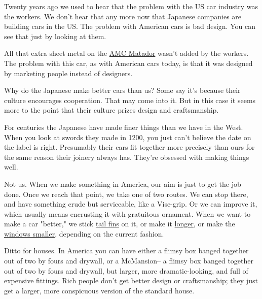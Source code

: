 Twenty years
                  ago we used to hear that the problem with the US car industry
                  was the workers. We don't hear that any more now that Japanese
                  companies are building cars in the US. The problem with
                  American cars is bad design. You can see that just by looking
                  at them.

All that extra sheet metal on the
                  \href{http://www.paulgraham.com/matador.html}{AMC Matador} wasn't added by the
                  workers. The problem with this car, as with American cars
                  today, is that it was designed by marketing people instead of
                  designers.

Why do the Japanese make better cars
                  than us? Some say it's because their culture encourages
                  cooperation. That may come into it. But in this case it seems
                  more to the point that their culture prizes design and
                  craftsmanship.

For centuries the Japanese have made
                  finer things than we have in the West. When you look at swords
                  they made in 1200, you just can't believe the date on the
                  label is right. Presumably their cars fit together more
                  precisely than ours for the same reason their joinery always
                  has. They're obsessed with making things well.

Not
                  us. When we make something in America, our aim is just to get
                  the job done. Once we reach that point, we take one of two
                  routes. We can stop there, and have something crude but
                  serviceable, like a Vise-grip. Or we can improve it, which
                  usually means encrusting it with gratuitous ornament. When we
                  want to make a car "better," we stick
                  \href{http://www.paulgraham.com/59eldorado.html}{tail fins} on it, or make it
                  \href{http://www.paulgraham.com/75eldorado.html}{longer}, or make the
                  \href{http://www.paulgraham.com/04magnum.html}{windows smaller}, depending on the
                  current fashion.

Ditto for houses. In America you
                  can have either a flimsy box banged together out of two by
                  fours and drywall, or a McMansion-- a flimsy box banged
                  together out of two by fours and drywall, but larger, more
                  dramatic-looking, and full of expensive fittings. Rich people
                  don't get better design or craftsmanship; they just get a
                  larger, more conspicuous version of the standard house.

